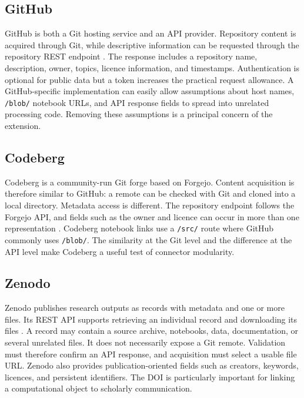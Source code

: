 \subsection{GitHub}

GitHub is both a Git hosting service and an API provider. Repository content is acquired through Git, while descriptive information can be requested through the repository REST endpoint \cite{githubapi}. The response includes a repository name, description, owner, topics, licence information, and timestamps. Authentication is optional for public data but a token increases the practical request allowance. A GitHub-specific implementation can easily allow assumptions about host names, \texttt{/blob/} notebook URLs, and API response fields to spread into unrelated processing code. Removing these assumptions is a principal concern of the extension.

\subsection{Codeberg}

Codeberg is a community-run Git forge based on Forgejo. Content acquisition is therefore similar to GitHub: a remote can be checked with Git and cloned into a local directory. Metadata access is different. The repository endpoint follows the Forgejo API, and fields such as the owner and licence can occur in more than one representation \cite{codebergapi}. Codeberg notebook links use a \texttt{/src/} route where GitHub commonly uses \texttt{/blob/}. The similarity at the Git level and the difference at the API level make Codeberg a useful test of connector modularity.

\subsection{Zenodo}

Zenodo publishes research outputs as records with metadata and one or more files. Its REST API supports retrieving an individual record and downloading its files \cite{zenodoapi}. A record may contain a source archive, notebooks, data, documentation, or several unrelated files. It does not necessarily expose a Git remote. Validation must therefore confirm an API response, and acquisition must select a usable file URL. Zenodo also provides publication-oriented fields such as creators, keywords, licences, and persistent identifiers. The DOI is particularly important for linking a computational object to scholarly communication.

